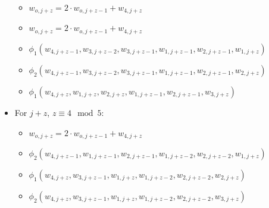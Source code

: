 \begin{itemize}
    \begin{itemize}
        \item $w_{o, j + z} = 2 \cdot w_{o, j + z - 1} + w_{4, j + z}$
        \item $w_{o, j + z} = 2 \cdot w_{o, j + z - 1} + w_{4, j + z}$
        \item $\phi_1(w_{4, j + z - 1}, w_{3, j + z - 2}, w_{3, j + z - 1}, w_{1, j + z - 1}, w_{2, j + z - 1}, w_{1, j + z})$
        \item $\phi_2(w_{4, j + z - 1}, w_{3, j + z - 2}, w_{3, j + z - 1}, w_{1, j + z - 1}, w_{2, j + z - 1}, w_{2, j + z})$
        \item $\phi_1(w_{4, j + z }, w_{1, j + z }, w_{2, j + z }, w_{1, j + z - 1}, w_{2, j + z - 1}, w_{3, j + z})$
    \end{itemize}
    \item For $j + z$, $z \equiv 4 \mod 5$:
    \begin{itemize}
        \item $w_{o, j + z} = 2 \cdot w_{o, j + z - 1} + w_{4, j + z}$
        \item $\phi_2(w_{4, j + z - 1}, w_{1, j + z - 1}, w_{2, j + z - 1}, w_{1, j + z - 2}, w_{2, j + z - 2}, w_{1, j + z})$
        \item $\phi_1(w_{4, j + z }, w_{3, j + z - 1}, w_{1, j + z }, w_{1, j + z - 2}, w_{2, j + z - 2}, w_{2, j + z})$
        \item $\phi_2(w_{4, j + z }, w_{3, j + z - 1}, w_{1, j + z }, w_{1, j + z - 2}, w_{2, j + z - 2}, w_{3, j + z})$
    \end{itemize}
\end{itemize}
